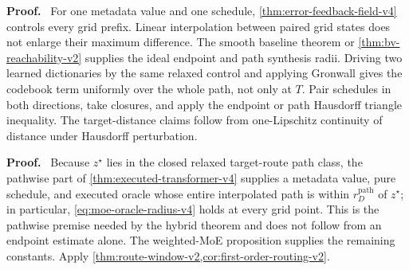 \documentclass[twoside,11pt]{article}
\renewenvironment{proof}[1][Proof]{\par\noindent\textbf{#1.}\ }{\hfill\BlackBox\par\medskip}
\newcommand{\norm}[1]{\left\lVert #1\right\rVert}
\begin{document}
\begin{proof}
For one metadata value and one schedule,
\cref{thm:error-feedback-field-v4} controls every grid prefix.  Linear
interpolation between paired grid states does not enlarge their maximum
difference.  The smooth baseline theorem or
\cref{thm:bv-reachability-v2} supplies the ideal endpoint and path synthesis
radii.  Driving two learned dictionaries by the same relaxed control and
applying Gronwall gives the codebook term uniformly over the whole path, not
only at $T$.  Pair schedules in both directions, take closures, and apply the
endpoint or path Hausdorff triangle inequality.  The target-distance claims
follow from one-Lipschitz continuity of distance under Hausdorff perturbation.
\end{proof}


\begin{proof}
Because $z^\star$ lies in the closed relaxed target-route path class, the
pathwise part of \cref{thm:executed-transformer-v4} supplies a metadata value,
pure schedule, and executed oracle whose entire interpolated path is within
$r_D^{\mathrm{path}}$ of $z^\star$; in particular,
\eqref{eq:moe-oracle-radius-v4} holds at every grid point.  This is the
pathwise premise needed by the hybrid theorem and does not follow from an
endpoint estimate alone.  The weighted-MoE proposition supplies the remaining
constants.  Apply \cref{thm:route-window-v2,cor:first-order-routing-v2}.
\end{proof}
\end{document}
